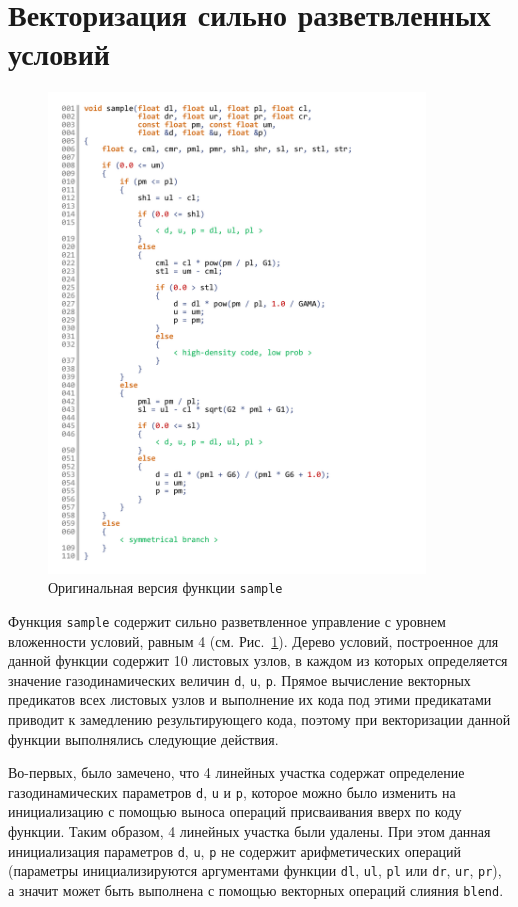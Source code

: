 \documentclass[utf8]{psta}
\begin{document}
\section{Векторизация сильно разветвленных условий}

\begin{figure}
\includegraphics[width=10cm]{pics/pic_sample_code_4}
\caption{Оригинальная версия функции \texttt{sample}}
\label{pic:sample_code_4}
\end{figure}

Функция \texttt{sample} содержит сильно разветвленное управление с уровнем вложенности условий, равным 4 (см. Рис.~\ref{pic:sample_code_4}).
Дерево условий, построенное для данной функции содержит 10 листовых узлов, в каждом из которых определяется значение газодинамических величин \texttt{d}, \texttt{u}, \texttt{p}.
Прямое вычисление векторных предикатов всех листовых узлов и выполнение их кода под этими предикатами приводит к замедлению результирующего кода, поэтому при векторизации данной функции выполнялись следующие действия.

Во-первых, было замечено, что 4 линейных участка содержат определение газодинамических параметров \texttt{d}, \texttt{u} и \texttt{p}, которое можно было изменить на инициализацию с помощью выноса операций присваивания вверх по коду функции.
Таким образом, 4 линейных участка были удалены.
При этом данная инициализация параметров \texttt{d}, \texttt{u}, \texttt{p} не содержит арифметических операций (параметры инициализируются аргументами функции \texttt{dl}, \texttt{ul}, \texttt{pl} или \texttt{dr}, \texttt{ur}, \texttt{pr}), а значит может быть выполнена с помощью векторных операций слияния \texttt{blend}.
\end{document}
